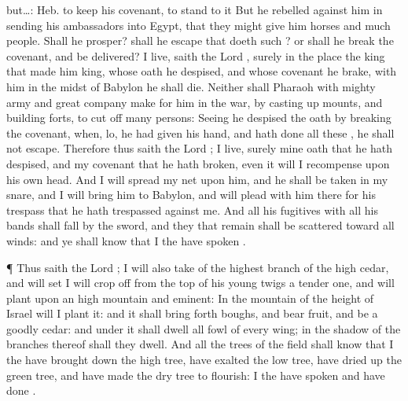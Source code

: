 {{but…: Heb. to keep his covenant, to stand to it}
But he
rebelled against him in
sending his
ambassadors into
Egypt, that they might
give him
horses and
much
people. Shall he
prosper? shall he
escape that
doeth such
{}? or shall he
break the
covenant, and be
delivered?
 I
live,
saith the
Lord
{}, surely in the
place
{} the
king
{} that made him
king, whose
oath he
despised, and whose
covenant he
brake,
{} with him in the
midst of
Babylon he shall
die.
Neither shall
Pharaoh with
{}
mighty
army and
great
company
make for him in the
war, by casting
up
mounts, and
building
forts, to cut
off
many
persons:
Seeing he
despised the
oath by
breaking the
covenant, when, lo, he had
given his
hand, and hath
done all these
{}, he shall not
escape.
Therefore thus
saith the
Lord
{};
{} I
live, surely mine
oath that he hath
despised, and my
covenant that he hath
broken, even it will I
recompense upon his own
head.
And I will
spread my
net upon him, and he shall be
taken in my
snare, and I will
bring him to
Babylon, and will
plead with him there for his
trespass that he hath
trespassed against me.
And all his
fugitives with all his
bands shall
fall by the
sword, and they that
remain shall be
scattered toward all
winds: and ye shall
know that I the
{} have
spoken
{}.
\par }{\PP {}¶ Thus
saith the
Lord
{}; I will also
take of the highest
branch of the
high
cedar, and will
set
{} I will crop
off from the
top of his young
twigs a tender
one, and will
plant
{} upon an
high
mountain and
eminent:
In the
mountain of the
height of
Israel will I
plant it: and it shall bring
forth
boughs, and
bear
fruit, and be a
goodly
cedar: and under it shall
dwell all
fowl of every
wing; in the
shadow of the
branches thereof shall they
dwell.
And all the
trees of the
field shall
know that I the
{} have brought
down the
high
tree, have
exalted the
low
tree, have
dried up the
green
tree, and have made the
dry
tree to
flourish: I the
{} have
spoken and have
done
{}.

}
